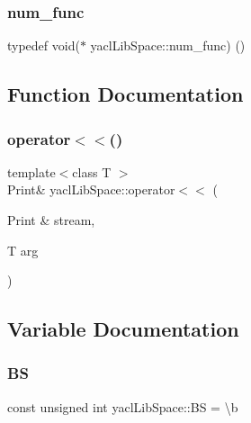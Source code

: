 \mbox{\label{namespaceyacl_lib_space_abe18da2116a229caa63a12870966ac35}} 
\subsubsection{\texorpdfstring{num\_func}{num\_func}}
{\footnotesize\ttfamily typedef void($\ast$ yacl\+Lib\+Space\+::num\+\_\+func) ()}



\subsection{Function Documentation}
\mbox{\label{namespaceyacl_lib_space_af69553ba98439734b940aa27111a72c3}} 
\subsubsection{\texorpdfstring{operator$<$$<$()}{operator<<()}}
{\footnotesize\ttfamily template$<$class T $>$ \\
Print\& yacl\+Lib\+Space\+::operator$<$$<$ (\begin{DoxyParamCaption}\item[{Print \&}]{stream,  }\item[{T}]{arg }\end{DoxyParamCaption})\hspace{0.3cm}{\ttfamily [inline]}}



\subsection{Variable Documentation}
\mbox{\label{namespaceyacl_lib_space_a62ce8ed70ded697194ee4b7a02662780}} 
\subsubsection{\texorpdfstring{BS}{BS}}
{\footnotesize\ttfamily const unsigned int yacl\+Lib\+Space\+::\+BS = \textquotesingle{}\textbackslash{}b\textquotesingle{}}

